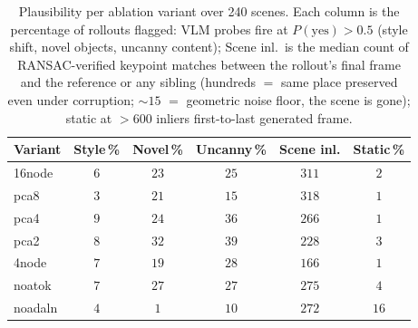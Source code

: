 \begin{table}[t]
\centering
\small
\setlength{\tabcolsep}{4pt}
\caption{Plausibility per ablation variant over 240 scenes. Each column is the percentage of rollouts flagged: VLM probes fire at $P(\text{yes})>0.5$ (style shift, novel objects, uncanny content); Scene inl.\ is the median count of RANSAC-verified keypoint matches between the rollout's final frame and the reference or any sibling (hundreds $=$ same place preserved even under corruption; ${\sim}15$ $=$ geometric noise floor, the scene is gone); static at $>600$ inliers first-to-last generated frame.}
\label{tab:plaus-ablation}
\begin{tabular}{lccccc}
\hline
Variant & Style\,\% & Novel\,\% & Uncanny\,\% & Scene inl. & Static\,\% \\
\hline
16node  & $6$ & $23$ & $25$ & $311$ & $2$  \\
pca8    & $3$ & $21$ & $15$ & $318$ & $1$  \\
pca4    & $9$ & $24$ & $36$ & $266$ & $1$  \\
pca2    & $8$ & $32$ & $39$ & $228$ & $3$  \\
4node   & $7$ & $19$ & $28$ & $166$ & $1$  \\
noatok  & $7$ & $27$ & $27$ & $275$ & $4$  \\
noadaln & $4$ & $1$  & $10$ & $272$ & $16$ \\
\hline
\end{tabular}
\end{table}
